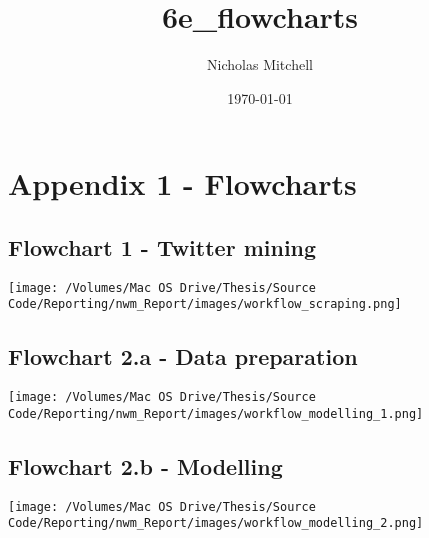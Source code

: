 \documentclass{article}
\author{Nicholas Mitchell}
\date{\today}
\title{6e\_flowcharts}
\begin{document}
\maketitle
\tableofcontents



\section{Appendix 1 - Flowcharts \label{flowcharts}}
\label{sec-1}


\subsection{Flowchart 1 - Twitter mining \label{flowchart-twitter-mining}}
\label{sec-1-1}

\texttt{[image: /Volumes/Mac OS Drive/Thesis/Source Code/Reporting/nwm\_Report/images/workflow\_scraping.png]}


\subsection{Flowchart 2.a - Data preparation \label{flowchart-mod}}
\label{sec-1-2}

\texttt{[image: /Volumes/Mac OS Drive/Thesis/Source Code/Reporting/nwm\_Report/images/workflow\_modelling\_1.png]}


\subsection{Flowchart 2.b - Modelling}
\label{sec-1-3}
\texttt{[image: /Volumes/Mac OS Drive/Thesis/Source Code/Reporting/nwm\_Report/images/workflow\_modelling\_2.png]}

\pagebreak
\end{document}
